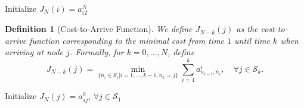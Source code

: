 \documentclass[a4 paper]{article}
\numberwithin{equation}{section}
\theoremstyle{boldStyle}
\theoremstyle{boldBlueStyle}
\theoremstyle{boldPurpleStyle}
\theoremstyle{boldRedStyle}
\newtheorem{definition}{Definition}[section]
\theoremstyle{boldGreenStyle}
\begin{document}
\begin{algorithm}[H]
    \SetNoFillComment
    \SetAlgoLined
    Initialize \( J_N(i) = a^N_{iT} \) \;
    \caption{} \label{algo:dp_solution_shortest_path}
\end{algorithm}


\begin{definition}[Cost-to-Arrive Function]
  We define \( J_{N-k}(j) \) as the cost-to-arrive function corresponding to the minimal cost from time \( 1 \) 
  until time \( k \) when arriving at node \( j \). Formally, for \( k = 0, \ldots, N \), define
  \begin{equation}
      J_{N-k}(j) = \min_{\{n_i \in \mathcal{S}_i | i=1,\ldots,k-1,n_k=j\}} \sum_{i=1}^{k} a^i_{n_{i-1}, n_i}, 
      \quad \forall j \in \mathcal{S}_k.
  \end{equation}
\end{definition}

\begin{algorithm}[H]
    \SetNoFillComment
    \SetAlgoLined
    Initialize \( J_N(j) = a^0_{sj} \), \( \forall j \in \mathcal{S}_1 \) \;
    \caption{} \label{algo:forward_algorithm_shortest_path}
\end{algorithm}



\newpage
\end{document}

